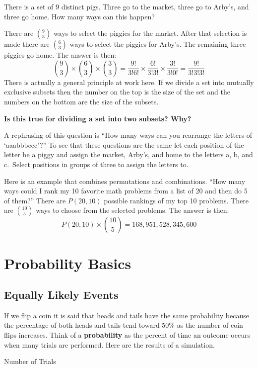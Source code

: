 \documentclass[
]{book}
\theoremstyle{definition}
\theoremstyle{definition}
\theoremstyle{definition}
\theoremstyle{remark}
\begin{document}
There is a set of \(9\) distinct pigs. Three go to the market, three go to Arby's, and three go home. How many ways can this happen?

There are \(9 \choose 3\) ways to select the piggies for the market. After that selection is made there are \(6 \choose 3\) ways to select the piggies for Arby's. The remaining three piggies go home. The answer is then:
\[{9 \choose 3}\times{6 \choose 3} \times {3 \choose 3} = \frac{9!}{3!6!}\times \frac{6!}{3!3!} \times \frac{3!}{3!0!} = \frac{9!}{3!3!3!}\]
There is actually a general principle at work here. If we divide a set into mutually exclusive subsets then the number on the top is the size of the set and the numbers on the bottom are the size of the subsets.

\textbf{Is this true for dividing a set into two subsets? Why?}

A rephrasing of this question is ``How many ways can you rearrange the letters of `aaabbbccc'?'' To see that these questions are the same let each position of the letter be a piggy and assign the market, Arby's, and home to the letters a, b, and c.~Select positions in groups of three to assign the letters to.

Here is an example that combines permutations and combinations. ``How many ways could I rank my 10 favorite math problems from a list of 20 and then do 5 of them?'' There are \(P(20,10)\) possible rankings of my top 10 problems. There are \(10 \choose 5\) ways to choose from the selected problems. The answer is then:
\[P(20,10)\times{10 \choose 5} = 168,951,528,345,600\]

\hypertarget{probability-basics}{%
\chapter{Probability Basics}\label{probability-basics}}

\hypertarget{equiprob}{%
\section{Equally Likely Events}\label{equiprob}}

If we flip a coin it is said that heads and tails have the same probability because the percentage of both heads and tails tend toward \(50\%\) as the number of coin flips increases. Think of a \textbf{probability} as the percent of time an outcome occurs when many trials are performed. Here are the results of a simulation.

Number of Trials
\end{document}

